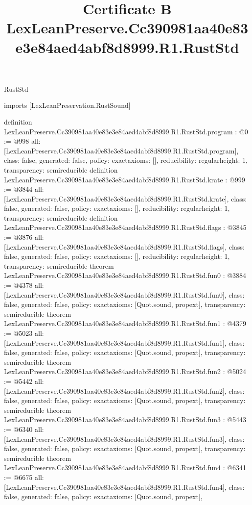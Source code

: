 \begin{lexlean}{RustStd}
\title{Certificate B LexLeanPreserve.Cc390981aa40e83e3e84aed4abf8d8999.R1.RustStd}
\begin{coremodule}
imports [LexLeanPreservation.RustSound]

definition LexLeanPreserve.Cc390981aa40e83e3e84aed4abf8d8999.R1.RustStd.program : @0 := @998 {
  all: [LexLeanPreserve.Cc390981aa40e83e3e84aed4abf8d8999.R1.RustStd.program],
  class: false,
  generated: false,
  policy: exact{axioms: []},
  reducibility: regular{height: 1},
  transparency: semireducible
}
definition LexLeanPreserve.Cc390981aa40e83e3e84aed4abf8d8999.R1.RustStd.krate : @999 := @3844 {
  all: [LexLeanPreserve.Cc390981aa40e83e3e84aed4abf8d8999.R1.RustStd.krate],
  class: false,
  generated: false,
  policy: exact{axioms: []},
  reducibility: regular{height: 1},
  transparency: semireducible
}
definition LexLeanPreserve.Cc390981aa40e83e3e84aed4abf8d8999.R1.RustStd.flags : @3845 := @3876 {
  all: [LexLeanPreserve.Cc390981aa40e83e3e84aed4abf8d8999.R1.RustStd.flags],
  class: false,
  generated: false,
  policy: exact{axioms: []},
  reducibility: regular{height: 1},
  transparency: semireducible
}
theorem LexLeanPreserve.Cc390981aa40e83e3e84aed4abf8d8999.R1.RustStd.fun0 : @3884 := @4378 {
  all: [LexLeanPreserve.Cc390981aa40e83e3e84aed4abf8d8999.R1.RustStd.fun0],
  class: false,
  generated: false,
  policy: exact{axioms: [Quot.sound, propext]},
  transparency: semireducible
}
theorem LexLeanPreserve.Cc390981aa40e83e3e84aed4abf8d8999.R1.RustStd.fun1 : @4379 := @5023 {
  all: [LexLeanPreserve.Cc390981aa40e83e3e84aed4abf8d8999.R1.RustStd.fun1],
  class: false,
  generated: false,
  policy: exact{axioms: [Quot.sound, propext]},
  transparency: semireducible
}
theorem LexLeanPreserve.Cc390981aa40e83e3e84aed4abf8d8999.R1.RustStd.fun2 : @5024 := @5442 {
  all: [LexLeanPreserve.Cc390981aa40e83e3e84aed4abf8d8999.R1.RustStd.fun2],
  class: false,
  generated: false,
  policy: exact{axioms: [Quot.sound, propext]},
  transparency: semireducible
}
theorem LexLeanPreserve.Cc390981aa40e83e3e84aed4abf8d8999.R1.RustStd.fun3 : @5443 := @6340 {
  all: [LexLeanPreserve.Cc390981aa40e83e3e84aed4abf8d8999.R1.RustStd.fun3],
  class: false,
  generated: false,
  policy: exact{axioms: [Quot.sound, propext]},
  transparency: semireducible
}
theorem LexLeanPreserve.Cc390981aa40e83e3e84aed4abf8d8999.R1.RustStd.fun4 : @6341 := @6675 {
  all: [LexLeanPreserve.Cc390981aa40e83e3e84aed4abf8d8999.R1.RustStd.fun4],
  class: false,
  generated: false,
  policy: exact{axioms: [Quot.sound, propext]},
}
\end{coremodule}
\end{lexlean}
